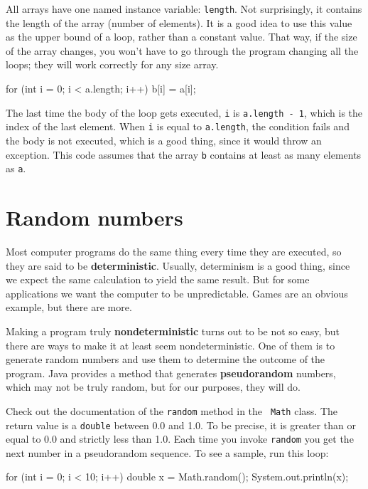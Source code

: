 All arrays have one named instance variable: {\tt length}.
Not surprisingly, it contains the length of the array (number
of elements).  It is a good idea to use this value as the upper
bound of a loop, rather than a constant value.  That way, if
the size of the array changes, you won't have to go through the
program changing all the loops; they will work correctly for any
size array.

\begin{code}
    for (int i = 0; i < a.length; i++) {
        b[i] = a[i];
    }
\end{code}

The last time the body of the loop gets executed, {\tt i}
is {\tt a.length - 1}, which is the index of the last element.  When
{\tt i} is equal to {\tt a.length}, the condition fails and the body
is not executed, which is a good thing, since it would throw an
exception.  This code assumes that the array {\tt b} contains at least
as many elements as {\tt a}.


\section{Random numbers}
\label{random}
\label{pseudorandom}

Most computer programs do the same thing every time they are executed,
so they are said to be {\bf deterministic}.  Usually, determinism is a
good thing, since we expect the same calculation to yield the same
result.  But for some applications we want the
computer to be unpredictable.  Games are an obvious example, but
there are more.

Making a program truly {\bf nondeterministic} turns out to be not so
easy, but there are ways to make it at least seem nondeterministic.
One of them is to generate random numbers and use them to determine
the outcome of the program.  Java provides a method that generates
{\bf pseudorandom} numbers, which may not be truly random, but for our
purposes, they will do.

Check out the documentation of the {\tt random} method in the {\tt
Math} class.  The return value is a {\tt double} between 0.0 and 1.0.
To be precise, it is greater than or equal to 0.0 and strictly less
than 1.0.  Each time you invoke {\tt random} you get the next
number in a pseudorandom sequence.
To see a sample, run this loop:

\begin{code}
    for (int i = 0; i < 10; i++) {
        double x = Math.random();
        System.out.println(x);
    }
\end{code}

